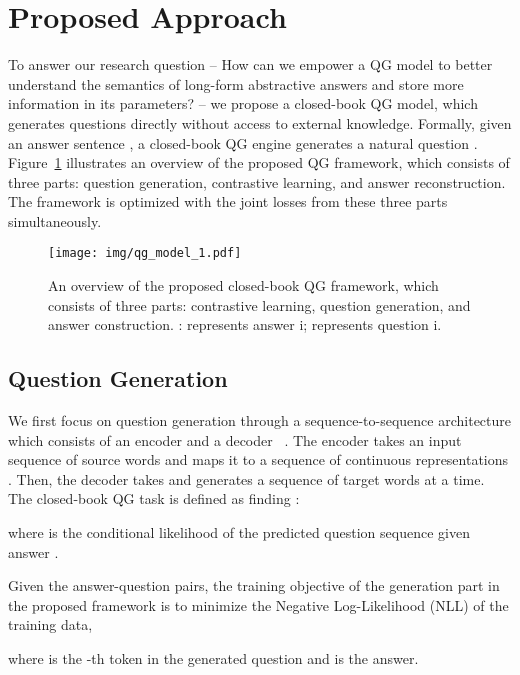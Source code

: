 \documentclass[11pt]{article}
\begin{document}
\section{Proposed Approach}
\label{sec:approach}

To answer our research question -- How can we empower a QG model to better understand the semantics of long-form abstractive answers and store more information in its parameters? -- we propose a closed-book QG model, which generates questions directly without access to external knowledge.
Formally, given an answer sentence , a closed-book QG engine generates a natural question .
Figure~\ref{fig:qg-framework} illustrates an overview of the proposed QG framework, which consists of three parts: question generation, contrastive learning, and answer reconstruction.
The framework is optimized with the joint losses from these three parts simultaneously.

\begin{figure}[htbp!]
\centering
\texttt{[image: img/qg\_model\_1.pdf]}
\caption{An overview of the proposed closed-book QG framework, which consists of three parts: contrastive learning, question generation, and answer construction. \textbf{}: represents answer i; \textbf{} represents question i.}    
\label{fig:qg-framework}
\end{figure}
\vspace{-0.1cm}

\subsection{Question Generation}
\label{subsec:qg}
We first focus on question generation through a  sequence-to-sequence architecture which consists of an encoder and a decoder ~\cite{sutskever-etal-2014-sequencetosequence,vaswani-etal-2017-attention}. 
The encoder takes an input sequence of source words  and maps it to a sequence of continuous representations . 
Then, the decoder takes  and generates a sequence of target words  at a time.
The closed-book QG task is defined as finding :

where  is the conditional likelihood of the predicted question sequence  given answer .


Given the answer-question pairs, the training objective of the generation part in the proposed framework is to minimize the Negative Log-Likelihood (NLL) of the training data,

where  is the -th token in the generated question and  is the answer.
\end{document}
